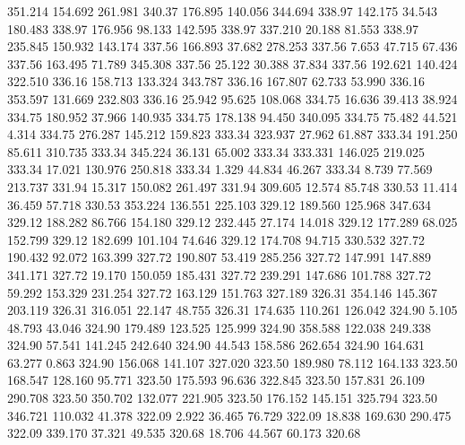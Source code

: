  351.214  154.692  261.981       340.37
 176.895  140.056  344.694       338.97
 142.175   34.543  180.483       338.97
 176.956   98.133  142.595       338.97
 337.210   20.188   81.553       338.97
 235.845  150.932  143.174       337.56
 166.893   37.682  278.253       337.56
   7.653   47.715   67.436       337.56
 163.495   71.789  345.308       337.56
  25.122   30.388   37.834       337.56
 192.621  140.424  322.510       336.16
 158.713  133.324  343.787       336.16
 167.807   62.733   53.990       336.16
 353.597  131.669  232.803       336.16
  25.942   95.625  108.068       334.75
  16.636   39.413   38.924       334.75
 180.952   37.966  140.935       334.75
 178.138   94.450  340.095       334.75
  75.482   44.521    4.314       334.75
 276.287  145.212  159.823       333.34
 323.937   27.962   61.887       333.34
 191.250   85.611  310.735       333.34
 345.224   36.131   65.002       333.34
 333.331  146.025  219.025       333.34
  17.021  130.976  250.818       333.34
   1.329   44.834   46.267       333.34
   8.739   77.569  213.737       331.94
  15.317  150.082  261.497       331.94
 309.605   12.574   85.748       330.53
  11.414   36.459   57.718       330.53
 353.224  136.551  225.103       329.12
 189.560  125.968  347.634       329.12
 188.282   86.766  154.180       329.12
 232.445   27.174   14.018       329.12
 177.289   68.025  152.799       329.12
 182.699  101.104   74.646       329.12
 174.708   94.715  330.532       327.72
 190.432   92.072  163.399       327.72
 190.807   53.419  285.256       327.72
 147.991  147.889  341.171       327.72
  19.170  150.059  185.431       327.72
 239.291  147.686  101.788       327.72
  59.292  153.329  231.254       327.72
 163.129  151.763  327.189       326.31
 354.146  145.367  203.119       326.31
 316.051   22.147   48.755       326.31
 174.635  110.261  126.042       324.90
   5.105   48.793   43.046       324.90
 179.489  123.525  125.999       324.90
 358.588  122.038  249.338       324.90
  57.541  141.245  242.640       324.90
  44.543  158.586  262.654       324.90
 164.631   63.277    0.863       324.90
 156.068  141.107  327.020       323.50
 189.980   78.112  164.133       323.50
 168.547  128.160   95.771       323.50
 175.593   96.636  322.845       323.50
 157.831   26.109  290.708       323.50
 350.702  132.077  221.905       323.50
 176.152  145.151  325.794       323.50
 346.721  110.032   41.378       322.09
   2.922   36.465   76.729       322.09
  18.838  169.630  290.475       322.09
 339.170   37.321   49.535       320.68
  18.706   44.567   60.173       320.68
